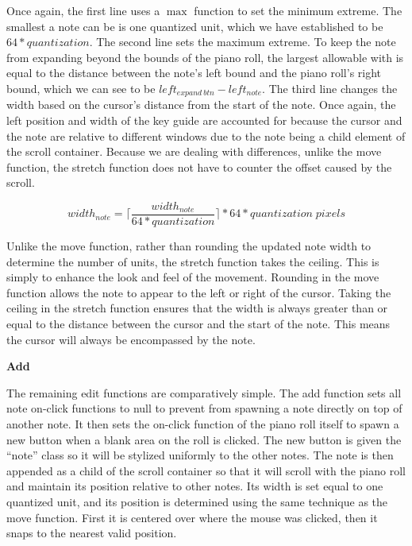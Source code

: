 Once again, the first line uses a $ \max $ function to set the minimum extreme. The smallest a note
can be is one quantized unit, which we have established to be $ 64 * quantization $. The second
line sets the maximum extreme. To keep the note from expanding beyond the bounds of the piano roll,
the largest allowable with is equal to the distance between the note’s left bound and the piano
roll’s right bound, which we can see to be $ left_{expand\:btn} - left_{note} $. The third line
changes the width based on the cursor’s distance from the start of the note. Once again, the left
position and width of the key guide are accounted for because the cursor and the note are relative
to different windows due to the note being a child element of the scroll container. Because we are
dealing with differences, unlike the move function, the stretch function does not have to counter
the offset caused by the scroll.

\begin{equation} \label{stretch_snap}
  width_{note} = \lceil\frac{width_{note}}{64 * quantization}\rceil * 64 * quantization \;pixels
\end{equation}

Unlike the move function, rather than rounding the updated note width to determine the number of
units, the stretch function takes the ceiling. This is simply to enhance the look and feel of the
movement. Rounding in the move function allows the note to appear to the left or right of the
cursor. Taking the ceiling in the stretch function ensures that the width is always greater than or
equal to the distance between the cursor and the start of the note. This means the cursor will
always be encompassed by the note.

\textbf{Add}

The remaining edit functions are comparatively simple. The add function sets all note on-click
functions to null to prevent from spawning a note directly on top of another note. It then sets the
on-click function of the piano roll itself to spawn a new button when a blank area on the roll is
clicked. The new button is given the “note” class so it will be stylized uniformly to the other
notes. The note is then appended as a child of the scroll container so that it will scroll with the
piano roll and maintain its position relative to other notes. Its width is set equal to one
quantized unit, and its position is determined using the same technique as the move function. First
it is centered over where the mouse was clicked, then it snaps to the nearest valid position.

